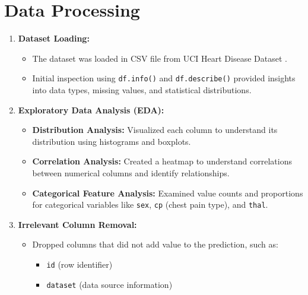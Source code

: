 \documentclass[pdflatex,sn-nature,Numbered]{sn-jnl}%
\theoremstyle{thmstyleone}%
\theoremstyle{thmstyletwo}%
\theoremstyle{thmstylethree}%
\begin{document}
\section{Data Processing}
\begin{enumerate}
    \item \textbf{Dataset Loading:}
    \begin{itemize}
        \item The dataset was loaded in CSV file from UCI Heart Disease Dataset \cite{dataset}.
        \item Initial inspection using \texttt{df.info()} and \texttt{df.describe()} provided insights into data types, missing values, and statistical distributions.
    \end{itemize}
    
    \item \textbf{Exploratory Data Analysis (EDA):}
    \begin{itemize}
        \item \textbf{Distribution Analysis:} Visualized each column to understand its distribution using histograms and boxplots.
        \item \textbf{Correlation Analysis:} Created a heatmap to understand correlations between numerical columns and identify relationships.
        \item \textbf{Categorical Feature Analysis:} Examined value counts and proportions for categorical variables like \texttt{sex}, \texttt{cp} (chest pain type), and \texttt{thal}.
    \end{itemize}

    \item \textbf{Irrelevant Column Removal:}
    \begin{itemize}
        \item Dropped columns that did not add value to the prediction, such as:
        \begin{itemize}
            \item \texttt{id} (row identifier)
            \item \texttt{dataset} (data source information)
        \end{itemize}
    \end{itemize}
    

\end{enumerate}
\end{document}
